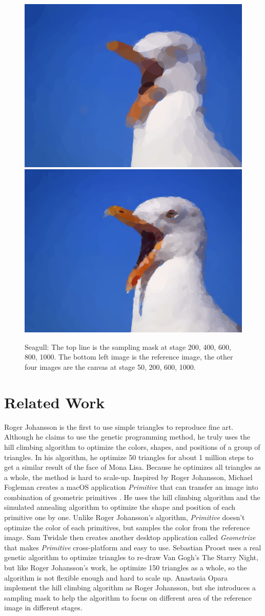 \documentclass[a4paper,conference]{IEEEtran}
\begin{document}
\begin{figure}[ht]
  \includegraphics[width=.18\textwidth]{imgs/seagull/7.png}
  \includegraphics[width=.18\textwidth]{imgs/seagull/10.png}
  \caption{Seagull: The top line is the sampling mask at stage 200, 400, 600, 800, 1000. The bottom left image is the reference image, the other four images are the canvas at stage 50, 200, 600, 1000.}
  \label{fig:seagull}
\end{figure}
\section{Related Work}

Roger Johansson is the first to use simple triangles to reproduce fine art\cite{evo-mona-lisa}. Although he claims to use the genetic programming method, he truly uses the hill climbing algorithm to optimize the colors, shapes, and positions of a group of triangles. In his algorithm, he optimize 50 triangles for about 1 million steps to get a similar result of the face of Mona Lisa. Because he optimizes all triangles as a whole, the method is hard to scale-up. Inspired by Roger Johansson, Michael Fogleman creates a macOS application \textit{Primitive} that can transfer an image into combination of geometric primitives \cite{primitive}. He uses the hill climbing algorithm and the simulated annealing algorithm to optimize the shape and position of each primitive one by one. Unlike Roger Johansson's algorithm, \textit{Primitive} doesn't optimize the color of each primitives, but samples the color from the reference image. Sam Twidale then creates another desktop application called \textit{Geometrize} that makes \textit{Primitive} cross-platform and easy to use\cite{geometrize}. Sebastian Proost uses a real genetic algorithm to optimize triangles to re-draw Van Gogh's The Starry Night\cite{starry-night}, but like Roger Johansson's work, he optimize 150 triangles as a whole, so the algorithm is not flexible enough and hard to scale up. Anastasia Opara implement the hill climbing algorithm as Roger Johansson\cite{genetic-drawing}, but she introduces a sampling mask to help the algorithm to focus on different area of the reference image in different stages.
\end{document}
